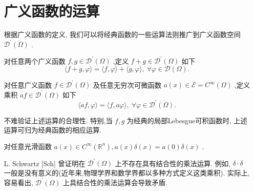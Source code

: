 \documentclass[lang=cn,newtx,10pt,scheme=chinese,thmcnt=chapter]{elegantbook}
\begin{document}
\section{广义函数的运算}

根据广义函数的定义, 我们可以将经典函数的一些运算法则推广到广义函数空间 \({\mathcal{D}}^{\prime }\left( \Omega \right)\) .

 \begin{definition}
  对任意两个广义函数 \(f,g \in  {\mathcal{D}}^{\prime }\left( \Omega \right)\) ,定义 \(f + g \in  {\mathcal{D}}^{\prime }\left( \Omega \right)\) 如下  
\begin{equation*}
  \langle f + g,\varphi \rangle  = \langle f,\varphi \rangle  + \langle g,\varphi \rangle ,\;\forall \varphi  \in  \mathcal{D}\left( \Omega \right) .
  \end{equation*}
  
  对任意广义函数 \(f \in  {\mathcal{D}}^{\prime }\left( \Omega \right)\) 及任意无穷次可微函数 \(a\left( x\right)  \in  \mathcal{E} = {C}^{\infty }\left( \Omega \right)\) ,定义乘积 \({af} \in  {\mathcal{D}}^{\prime }\left( \Omega \right)\) 如下  \begin{equation*}
  \langle {af},\varphi \rangle  = \langle f,{a\varphi }\rangle ,\;\forall \varphi  \in  {\mathcal{D}}^{\prime }\left( \Omega \right) .
  \end{equation*}
\end{definition}
\begin{note}
不难验证上述运算的合理性. 特别,当 \(f,g\) 为经典的局部Lebesgue可积函数时, 上述运算可归为经典函数的相应运算.
\end{note}
 \begin{example}
  对任意光滑函数 \(a\left( x\right)  \in  {C}^{\infty }\left( {\mathbb{R}}^{n}\right) ,a\left( x\right) \delta \left( x\right)  = a\left( 0\right) \delta \left( x\right)\) .
  
  L. Schwartz [Sch] 曾证明在 \({\mathcal{D}}^{\prime }\left( \Omega \right)\) 上不存在具有结合性的乘法运算. 例如, \(\delta  \cdot  \delta\) 一般是没有意义的(近年来,物理学界和数学界都以多种方式定义这类乘积). 实际上,容易看出, \({\mathcal{D}}^{\prime }\left( \Omega \right)\) 上具结合性的乘法运算会导致矛盾.
  
\end{example}
\end{document}
